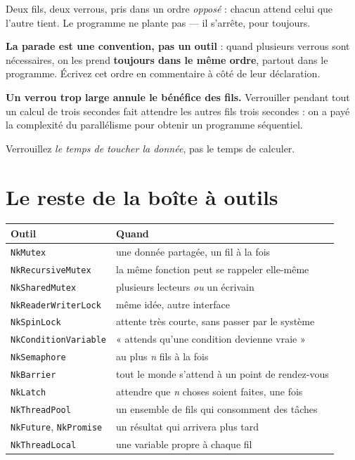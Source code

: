 \begin{nkpiege}
Deux fils, deux verrous, pris dans un ordre \emph{opposé} : chacun attend celui
que l'autre tient. Le programme ne plante pas --- il s'arrête, pour toujours.

\textbf{La parade est une convention, pas un outil} : quand plusieurs verrous
sont nécessaires, on les prend \textbf{toujours dans le même ordre}, partout dans
le programme. Écrivez cet ordre en commentaire à côté de leur déclaration.
\end{nkpiege}

\begin{nkpiege}
\textbf{Un verrou trop large annule le bénéfice des fils.} Verrouiller pendant
tout un calcul de trois secondes fait attendre les autres fils trois secondes :
on a payé la complexité du parallélisme pour obtenir un programme séquentiel.

Verrouillez \emph{le temps de toucher la donnée}, pas le temps de calculer.
\end{nkpiege}

\section{Le reste de la boîte à outils}

\begin{center}
\begin{tabular}{@{}ll@{}}
\toprule
\textbf{Outil} & \textbf{Quand} \\
\midrule
\texttt{NkMutex} & une donnée partagée, un fil à la fois \\
\texttt{NkRecursiveMutex} & la même fonction peut se rappeler elle-même \\
\texttt{NkSharedMutex} & plusieurs lecteurs \emph{ou} un écrivain \\
\texttt{NkReaderWriterLock} & même idée, autre interface \\
\texttt{NkSpinLock} & attente très courte, sans passer par le système \\
\texttt{NkConditionVariable} & « attends qu'une condition devienne vraie » \\
\texttt{NkSemaphore} & au plus \emph{n} fils à la fois \\
\texttt{NkBarrier} & tout le monde s'attend à un point de rendez-vous \\
\texttt{NkLatch} & attendre que \emph{n} choses soient faites, une fois \\
\texttt{NkThreadPool} & un ensemble de fils qui consomment des tâches \\
\texttt{NkFuture}, \texttt{NkPromise} & un résultat qui arrivera plus tard \\
\texttt{NkThreadLocal} & une variable propre à chaque fil \\
\bottomrule
\end{tabular}
\end{center}

